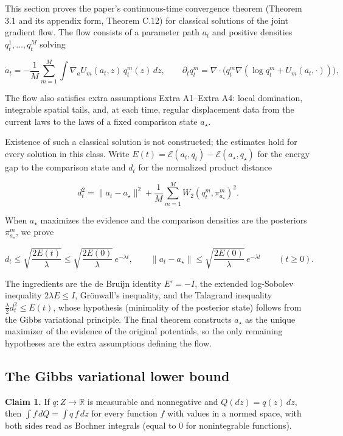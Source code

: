 \documentclass[11pt,a4paper]{report}
\begin{document}
This section proves the paper's continuous-time convergence theorem (Theorem 3.1 and its appendix form, Theorem C.12) for classical solutions of the joint gradient flow. The flow consists of a parameter path \(a_t\) and positive densities \(q_t^1,\dots,q_t^M\) solving


\[\dot a_t=-\frac1M\sum_{m=1}^M\int\nabla_aU_m(a_t,z)\,q_t^m(z)\,dz,\qquad\partial_tq_t^m=\nabla\cdot\bigl(q_t^m\nabla(\log q_t^m+U_m(a_t,\cdot))\bigr),\]


The flow also satisfies extra assumptions Extra A1–Extra A4: local domination, integrable spatial tails, and, at each time, regular displacement data from the current laws to the laws of a fixed comparison state \(a_\star\).




Existence of such a classical solution is not constructed; the estimates hold for every solution in this class. Write \(E(t)=\mathcal E(a_t,q_t)-\mathcal E(a_\star,q_\star)\) for the energy gap to the comparison state and \(d_t\) for the normalized product distance


\[d_t^2=\|a_t-a_\star\|^2+\frac1M\sum_{m=1}^MW_2(q_t^m,\pi_{a_\star}^m)^2.\]


When \(a_\star\) maximizes the evidence and the comparison densities are the posteriors \(\pi_{a_\star}^m\), we prove


\[d_t\le\sqrt{\frac{2E(t)}\lambda}\le\sqrt{\frac{2E(0)}\lambda}\,e^{-\lambda t},\qquad\|a_t-a_\star\|\le\sqrt{\frac{2E(0)}\lambda}\,e^{-\lambda t}\qquad(t\ge0).\]


The ingredients are the de Bruijn identity \(E'=-I\), the extended log-Sobolev inequality \(2\lambda E\le I\), Grönwall's inequality, and the Talagrand inequality \(\frac\lambda2d_t^2\le E(t)\), whose hypothesis (minimality of the posterior state) follows from the Gibbs variational principle. The final theorem constructs \(a_\star\) as the unique maximizer of the evidence of the original potentials, so the only remaining hypotheses are the extra assumptions defining the flow.

\subsection{\texorpdfstring{The Gibbs variational lower bound}{The Gibbs variational lower bound}}


\textbf{Claim 1.} If \(q:Z\to\mathbb R\) is measurable and nonnegative and \(Q(dz)=q(z)\,dz\), then \(\int f\,dQ=\int q\,f\,dz\) for every function \(f\) with values in a normed space, with both sides read as Bochner integrals (equal to \(0\) for nonintegrable functions).
\end{document}
